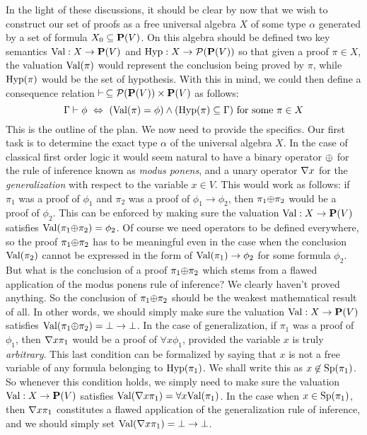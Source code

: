 In the light of these discussions, it should be clear by now that we
wish to construct our set of proofs as a free universal algebra $X$
of some type $\alpha$ generated by a set of formula
$X_{0}\subseteq\mbox{${\bf P}(V)$}$. On this algebra should be defined two key
semantics $\mbox{\rm Val}:X\to\mbox{${\bf P}(V)$}$ and $\mbox{\rm Hyp}:X\to{\cal P}(\mbox{${\bf P}(V)$})$ so that given
a proof $\pi\in X$, the valuation $\mbox{\rm Val}(\pi)$  would represent the
conclusion being proved by $\pi$, while $\mbox{\rm Hyp}(\pi)$ would be the set
of hypothesis. With this in mind, we could then define a consequence
relation $\vdash\,\subseteq{\cal P}(\mbox{${\bf P}(V)$})\times\mbox{${\bf P}(V)$}$ as follows:
    \[
    \Gamma\vdash\phi\ \Leftrightarrow\
    (\mbox{\rm Val}(\pi)=\phi)\land(\mbox{\rm Hyp}(\pi)\subseteq\Gamma)\mbox{\ for some
    $\pi\in X$}
    \]
This is the outline of the plan. We now need to provide the
specifics. Our first task is to determine the exact type $\alpha$ of
the universal algebra $X$. In the case of classical first order
logic it would seem natural to have a binary operator $\mbox{$\oplus$}$ for the
rule of inference known as {\em modus ponens}, and a unary operator
$\mbox{$\nabla$} x$ for the {\em generalization} with respect to the variable
$x\in V$. This would work as follows: if $\pi_{1}$ was a proof of
$\phi_{1}$ and $\pi_{2}$ was a proof of $\phi_{1}\to\phi_{2}$, then
$\pi_{1}\mbox{$\oplus$}\pi_{2}$ would be a proof of $\phi_{2}$. This can be
enforced by making sure the valuation $\mbox{\rm Val}:X\to\mbox{${\bf P}(V)$}$ satisfies
$\mbox{\rm Val}(\pi_{1}\mbox{$\oplus$}\pi_{2})=\phi_{2}$. Of course we need operators to
be defined everywhere, so the proof $\pi_{1}\mbox{$\oplus$}\pi_{2}$ has to be
meaningful even in the case when the conclusion $\mbox{\rm Val}(\pi_{2})$
cannot be expressed in the form of $\mbox{\rm Val}(\pi_{1})\to\phi_{2}$ for
some formula $\phi_{2}$. But what is the conclusion of a proof
$\pi_{1}\mbox{$\oplus$}\pi_{2}$ which stems from a flawed application of the
modus ponens rule of inference? We clearly haven't proved anything.
So the conclusion of $\pi_{1}\mbox{$\oplus$}\pi_{2}$ should be the weakest
mathematical result of all. In other words, we should simply make
sure the valuation $\mbox{\rm Val}:X\to\mbox{${\bf P}(V)$}$ satisfies
$\mbox{\rm Val}(\pi_{1}\mbox{$\oplus$}\pi_{2})=\bot\to\bot$. In the case of
generalization, if $\pi_{1}$ was a proof of $\phi_{1}$, then $\mbox{$\nabla$}
x\pi_{1}$ would be a proof of $\forall x\phi_{1}$, provided the
variable $x$ is truly {\em arbitrary}. This last condition can be
formalized by saying that $x$ is not a free variable of any formula
belonging to $\mbox{\rm Hyp}(\pi_{1})$. We shall write this as
$x\not\in\mbox{\rm Sp}(\pi_{1})$. So whenever this condition holds, we
simply need to make sure the valuation $\mbox{\rm Val}:X\to\mbox{${\bf P}(V)$}$ satisfies
$\mbox{\rm Val}(\mbox{$\nabla$} x\pi_{1})=\forall x\mbox{\rm Val}(\pi_{1})$. In the case when
$x\in\mbox{\rm Sp}(\pi_{1})$, then $\mbox{$\nabla$} x\pi_{1}$ constitutes a flawed
application of the generalization rule of inference, and we should
simply set $\mbox{\rm Val}(\mbox{$\nabla$} x\pi_{1})=\bot\to\bot$.

